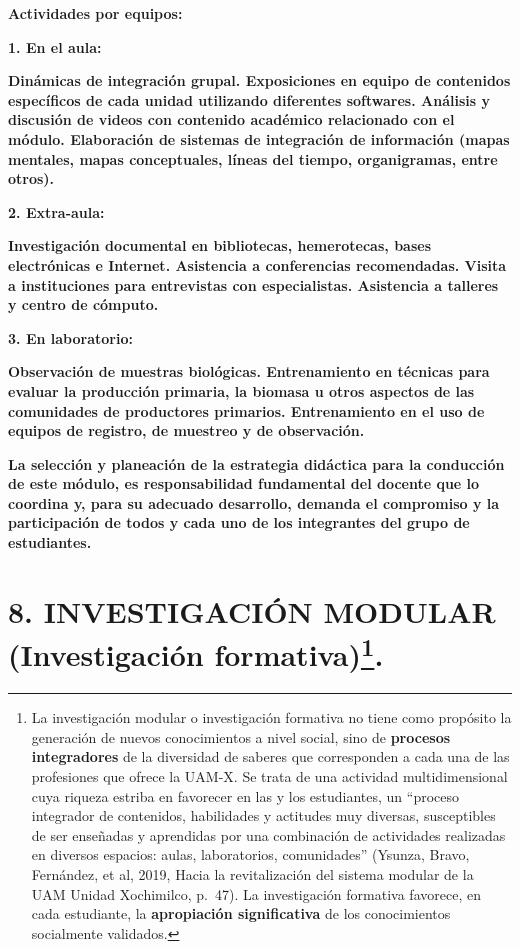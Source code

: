 \documentclass[
]{article}
\begin{document}
\textbf{Actividades por equipos:}

\textbf{1. En el aula:}

\textbf{Dinámicas de integración grupal. Exposiciones en equipo de
contenidos específicos de cada unidad utilizando diferentes softwares.
Análisis y discusión de videos con contenido académico relacionado con
el módulo. Elaboración de sistemas de integración de información (mapas
mentales, mapas conceptuales, líneas del tiempo, organigramas, entre
otros).}

\textbf{2. Extra-aula:}

\textbf{Investigación documental en bibliotecas, hemerotecas, bases
electrónicas e Internet. Asistencia a conferencias recomendadas. Visita
a instituciones para entrevistas con especialistas. Asistencia a
talleres y centro de cómputo.}

\textbf{\hfill\break
}

\textbf{3. En laboratorio:}

\textbf{Observación de muestras biológicas. Entrenamiento en técnicas
para evaluar la producción primaria, la biomasa u otros aspectos de las
comunidades de productores primarios. Entrenamiento en el uso de equipos
de registro, de muestreo y de observación.}

\textbf{La selección y planeación de la estrategia didáctica para la
conducción de este módulo, es responsabilidad fundamental del docente
que lo coordina y, para su adecuado desarrollo, demanda el compromiso y
la participación de todos y cada uno de los integrantes del grupo de
estudiantes.}

\hypertarget{investigaciuxf3n-modular-investigaciuxf3n-formativa3.}{%
\section[\textbf{8. INVESTIGACIÓN MODULAR (Investigación
formativa)}\textbf{.}]{\texorpdfstring{\textbf{8. INVESTIGACIÓN MODULAR
(Investigación
formativa)}\footnote{La investigación modular o investigación formativa
  no tiene como propósito la generación de nuevos conocimientos a nivel
  social, sino de \textbf{procesos integradores} de la diversidad de
  saberes que corresponden a cada una de las profesiones que ofrece la
  UAM-X. Se trata de una actividad multidimensional cuya riqueza estriba
  en favorecer en las y los estudiantes, un ``proceso integrador de
  contenidos, habilidades y actitudes muy diversas, susceptibles de ser
  enseñadas y aprendidas por una combinación de actividades realizadas
  en diversos espacios: aulas, laboratorios, comunidades'' (Ysunza,
  Bravo, Fernández, et al, 2019, Hacia la revitalización del sistema
  modular de la UAM Unidad Xochimilco, p.~47). La investigación
  formativa favorece, en cada estudiante, la \textbf{apropiación
  significativa} de los conocimientos socialmente validados.}\textbf{.}}{8. INVESTIGACIÓN MODULAR (Investigación formativa).}}\label{investigaciuxf3n-modular-investigaciuxf3n-formativa3.}}
\end{document}
